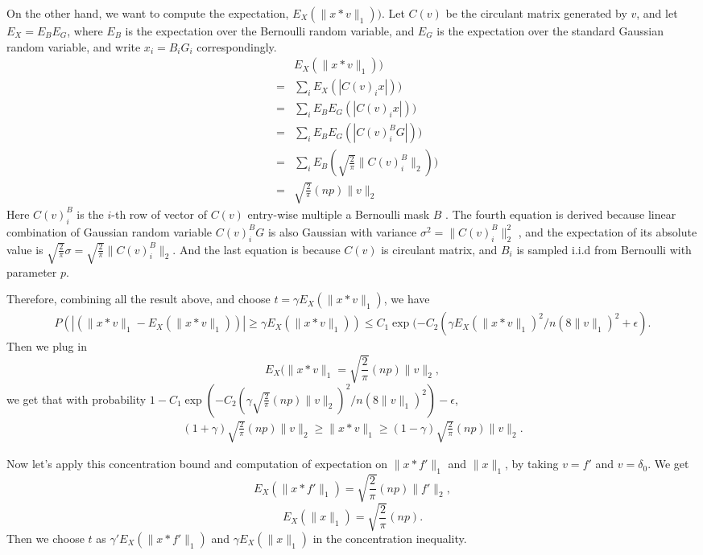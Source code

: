 \documentclass[letter, 10pt]{article}
\numberwithin{equation}{section}
\def \endprf{\hfill {\vrule height6pt width6pt depth0pt}\medskip}
\newenvironment{proof}{\noindent {\bf Proof} }{\endprf\par}
\begin{document}
\begin{proof}
On the other hand, we want to compute the expectation, $ E_X(\|x*v\|_1))$. Let $C(v)$ be the circulant matrix generated by $v$, and let $ E_X = E_B E_G$, where $E_B$ is the expectation over the Bernoulli random variable, and $E_G$ is the expectation over the standard Gaussian random variable, and write $x_i=B_i G_i$ correspondingly.
\begin{eqnarray*}
 & &E_X(\|x*v\|_1)) \\&=& 
 \sum_i E_X(|C(v)_i x|))\\&=&
 \sum_i E_B E_G(|C(v)_i x|))\\&=&
  \sum_i E_B E_G(|C(v)_i^B G|))\\&=&
 \sum_i E_B (\sqrt{\frac{2}{\pi}}\|C(v)_i^B\|_2))\\&=&
 \sqrt{\frac{2}{\pi}}(np)\|v\|_2
\end{eqnarray*}
Here $C(v)_i^B$ is the $i$-th row of vector of $C(v)$ entry-wise multiple a Bernoulli mask $B$ .
The fourth equation is derived because linear combination of Gaussian random variable $C(v)_i^B G$ is also Gaussian with variance $\sigma^2 = \|C(v)_i^B\|_2^2$ , and the expectation of its absolute value is $\sqrt{\frac{2}{\pi}}\sigma = \sqrt{\frac{2}{\pi}}\|C(v)_i^B\|_2$. And the last equation is because $C(v)$ is circulant matrix, and $B_i$ is sampled i.i.d from Bernoulli with parameter $p$. 

Therefore, combining all the result above, and choose $t=\gamma E_X(\|x*v\|_1)$, we have
\begin{eqnarray*}
P(|( \|x*v\|_1 - E_X(\|x*v\|_1) )|\geq \gamma E_X(\|x*v\|_1) )\leq C_1 \exp (-C_2 (\gamma E_X(\|x*v\|_1)^2/n(8\|v\|_1)^2+\epsilon).
\end{eqnarray*}
Then we plug in 
$$E_X(\|x*v\|_1 = \sqrt{\frac{2}{\pi}}(np)\|v\|_2,$$ 
we get that with probability $1-C_1 \exp (-C_2 (\gamma\sqrt{\frac{2}{\pi}}(np)\|v\|_2)^2/n(8\|v\|_1)^2)-\epsilon$, 
\begin{eqnarray*}
 (1+\gamma) \sqrt{\frac{2}{\pi}}(np)\|v\|_2 \geq \|x*v\|_1  \geq (1-\gamma) \sqrt{\frac{2}{\pi}}(np)\|v\|_2.
\end{eqnarray*}


Now let's apply this concentration bound and computation of expectation on $\|x*f'\|_1$ and $\|x\|_1$, by taking $v=f'$ and $v=\delta_0$. 
We get 
$$E_X(\|x*f'\|_1)= \sqrt{\frac{2}{\pi}}(np)\|f'\|_2,$$
$$E_X(\|x\|_1)= \sqrt{\frac{2}{\pi}}(np).$$
Then we choose $t$ as $\gamma' E_X(\|x*f'\|_1)$ and $\gamma E_X(\|x\|_1)$ in the concentration inequality. 


\end{proof}
\end{document}
